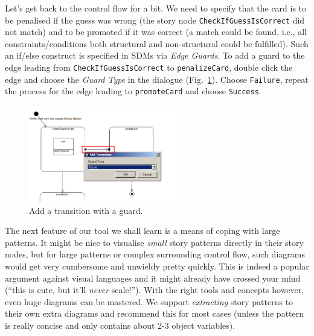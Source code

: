 Let's get back to the control flow for a bit.  We need to specify that the card
is to be penalised if the guess was wrong (the story node
\texttt{Check\-If\-Guess\-Is\-Correct} did not match) and to be promoted if it
was correct (a match could be found, i.e., all constraints/conditions both
structural and non-structural could be fulfilled).  Such an if/else construct is
specified in SDMs via \emph{Edge Guards}.  To add a guard to the edge leading
from \texttt{Check\-If\-Guess\-Is\-Correct} to \texttt{penalize\-Card}, double
click the edge and choose the \emph{Guard Type} in the dialogue
(Fig.~\ref{fig:sdm_check_guard}).  Choose \texttt{Failure}, repeat the process
for the edge leading to \texttt{promoteCard} and choose \texttt{Success}.

\begin{figure}[!htbp]
\begin{center}
  \includegraphics[width=0.6\textwidth]{pics/sdmBilder/check/sdm19}
  \caption{Add a transition with a guard.}  
  \label{fig:sdm_check_guard}
\end{center}
\end{figure}

The next feature of our tool we shall learn is a means of coping with large
patterns.  It might be nice to visualise \emph{small} story patterns directly in
their story nodes, but for large patterns or complex surrounding control flow,
such diagrams would get very cumbersome and unwieldy pretty quickly.  This is
indeed a popular argument against visual languages and it might already have
crossed your mind (``this is cute, but it'll \emph{never} scale!'').  With the
right tools and concepts however, even huge diagrams can be mastered.  We
support \emph{extracting} story patterns to their own extra diagrams and
recommend this for most cases (unless the pattern is really concise and
only contains about 2-3 object variables).  

